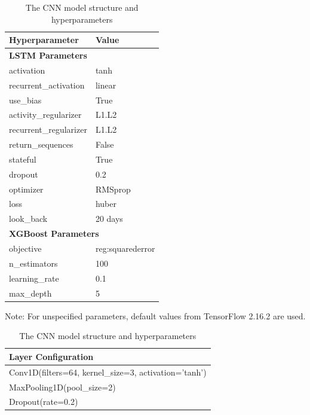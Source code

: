 \documentclass{article}
\begin{document}
\begin{table}[H]
\centering
\begin{minipage}[t]{0.48\textwidth}
    \centering
    \caption{The LSTM-XGBoost forecast model hyperparameters}
    \begin{tabular}{@{}ll@{}}
        \toprule
        \textbf{Hyperparameter} & \textbf{Value} \\ \midrule
        \multicolumn{2}{l}{\textbf{LSTM Parameters}} \\
        activation & tanh \\
        recurrent\_activation & linear \\
        use\_bias & True \\
        activity\_regularizer & L1.L2 \\
        recurrent\_regularizer & L1.L2 \\
        return\_sequences & False \\
        stateful & True \\
        dropout & 0.2 \\
        optimizer & RMSprop \\
        loss & huber \\ 
        look\_back & 20 days \\ \midrule
        \multicolumn{2}{l}{\textbf{XGBoost Parameters}} \\
        objective & reg:squarederror \\
        n\_estimators & 100 \\
        learning\_rate & 0.1 \\
        max\_depth & 5 \\ \bottomrule
    \end{tabular}
    \vspace{0cm}
    \footnotesize Note: For unspecified parameters, default values from TensorFlow 2.16.2 are used.
    \label{tab:LSTM_XGBoost}
\end{minipage}%
\hfill
\begin{minipage}[t]{0.48\textwidth}
    \centering
    \caption{The CNN model structure and hyperparameters}
    \begin{tabular}{@{}p{5cm}@{}}
        \toprule
        \textbf{Layer Configuration} \\ \midrule
        Conv1D(filters=64, kernel\_size=3, activation='tanh') \\
        MaxPooling1D(pool\_size=2) \\
        Dropout(rate=0.2) \\

\end{tabular}
\end{minipage}
\end{table}
\end{document}
